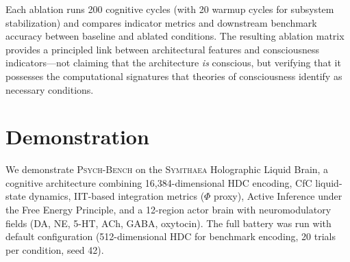 \documentclass[11pt,letterpaper]{article}
\newcommand{\symthaea}{\textsc{Symthaea}}
\newcommand{\psychbench}{\textsc{Psych-Bench}}
\begin{document}
Each ablation runs 200 cognitive cycles (with 20 warmup cycles for subsystem stabilization) and compares indicator metrics and downstream benchmark accuracy between baseline and ablated conditions. The resulting ablation matrix provides a principled link between architectural features and consciousness indicators---not claiming that the architecture \emph{is} conscious, but verifying that it possesses the computational signatures that theories of consciousness identify as necessary conditions.

\section{Demonstration}
\label{sec:demonstration}

We demonstrate \psychbench{} on the \symthaea{} Holographic Liquid Brain, a cognitive architecture combining 16,384-dimensional HDC encoding, CfC liquid-state dynamics, IIT-based integration metrics ($\Phi$ proxy), Active Inference under the Free Energy Principle, and a 12-region actor brain with neuromodulatory fields (DA, NE, 5-HT, ACh, GABA, oxytocin). The full battery was run with default configuration (512-dimensional HDC for benchmark encoding, 20 trials per condition, seed 42).
\end{document}
